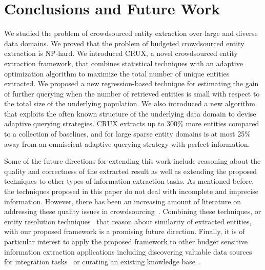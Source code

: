 
\section{Conclusions and Future Work}
\label{sec:conclusions}
We studied the problem of crowdsourced entity extraction over large and diverse data domains. We proved that the problem of budgeted crowdsourced entity extraction is NP-hard. We introduced CRUX, a novel crowdsourced entity extraction framework, that combines statistical techniques with an adaptive optimization algorithm to maximize the total number of unique entities extracted. We proposed a new regression-based technique for estimating the gain of further querying when the number of retrieved entities is small with respect to the total size of the underlying population. We also introduced a new algorithm that exploits the often known structure of the underlying data domain to devise adaptive querying strategies. CRUX extracts up to 300\% more entities compared to a collection of baselines, and for large sparse entity domains is at most 25\% away from an omniscient adaptive querying strategy with perfect information.

Some of the future directions for extending this work include reasoning about the quality and correctness of the extracted result as well as extending the proposed techniques to other types of information extraction tasks. As mentioned before, the techniques proposed in this paper do not deal with incomplete and imprecise information. However, there has been an increasing amount of literature on addressing these quality issues in crowdsourcing~\cite{ vox-populii, quality, nushi:14, raykar-whom-to-trust}. Combining these techniques, or entity resolution techniques~\cite{crowder} that reason about similarity of extracted entities, with our proposed framework is a promising future direction. Finally, it is of particular interest to apply the proposed framework to other budget sensitive information extraction applications including discovering valuable data sources for integration tasks~\cite{rekatsinas:2015, rekatsinas:2014} or curating an existing knowledge base~\cite{kondredi:2014}.